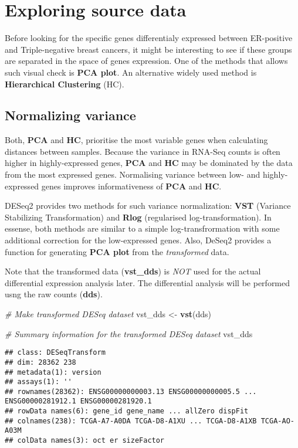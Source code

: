 \documentclass[]{book}
\newenvironment{Shaded}{\begin{snugshade}}{\end{snugshade}}
\newcommand{\KeywordTok}[1]{\textcolor[rgb]{0.13,0.29,0.53}{\textbf{#1}}}
\newcommand{\StringTok}[1]{\textcolor[rgb]{0.31,0.60,0.02}{#1}}
\newcommand{\CommentTok}[1]{\textcolor[rgb]{0.56,0.35,0.01}{\textit{#1}}}
\newcommand{\NormalTok}[1]{#1}
\begin{document}
\section{Exploring source data}\label{exploring-source-data}

Before looking for the specific genes differentialy expressed between
ER-positive and Triple-negative breast cancers, it might be interesting
to see if these groups are separated in the space of genes expression.
One of the methods that allows such visual check is \textbf{PCA plot}.
An alternative widely used method is \textbf{Hierarchical Clustering}
(HC).

\subsection{Normalizing variance}\label{normalizing-variance}

Both, \textbf{PCA} and \textbf{HC}, prioritise the most variable genes
when calculating distances between samples. Because the variance in
RNA-Seq counts is often higher in highly-expressed genes, \textbf{PCA}
and \textbf{HC} may be dominated by the data from the most expressed
genes. Normalising variance between low- and highly- expressed genes
improves informativeness of \textbf{PCA} and \textbf{HC}.

DESeq2 provides two methods for such variance normalization:
\textbf{VST} (Variance Stabilizing Transformation) and \textbf{Rlog}
(regularised log-transformation). In essense, both methods are similar
to a simple log-transfrormation with some additional correction for the
low-expressed genes. Also, DeSeq2 provides a function for generating
\textbf{PCA plot} from the \emph{transformed} data.

Note that the transformed data (\textbf{vst\_dds}) is \emph{NOT} used
for the actual differential expression analysis later. The differential
analysis will be performed usng the raw counts (\textbf{dds}).

\begin{Shaded}
\begin{Highlighting}[]
\CommentTok{# Make transformed DESeq dataset}
\NormalTok{vst_dds <-}\StringTok{ }\KeywordTok{vst}\NormalTok{(dds) }

\CommentTok{# Summary information for the transformed DESeq dataset}
\NormalTok{vst_dds }
\end{Highlighting}
\end{Shaded}

\begin{verbatim}
## class: DESeqTransform 
## dim: 28362 238 
## metadata(1): version
## assays(1): ''
## rownames(28362): ENSG00000000003.13 ENSG00000000005.5 ... ENSG00000281912.1 ENSG00000281920.1
## rowData names(6): gene_id gene_name ... allZero dispFit
## colnames(238): TCGA-A7-A0DA TCGA-D8-A1XU ... TCGA-D8-A1XB TCGA-AO-A03M
## colData names(3): oct er sizeFactor
\end{verbatim}
\end{document}
